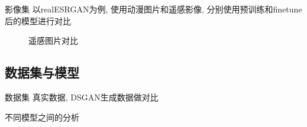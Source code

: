 \begin{frame}{影像集}
    以realESRGAN为例, 使用动漫图片和遥感影像, 分别使用预训练和finetune后的模型进行对比

    \begin{figure}[!htbp]
        \centering
        \quad
        \caption{遥感图片对比}
        \label{fig:0202}
    \end{figure}

\end{frame}

\subsection{数据集与模型}
\begin{frame}{数据集}
    真实数据, DSGAN生成数据做对比

    不同模型之间的分析
\end{frame}
